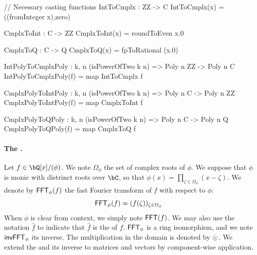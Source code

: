 \begin{code}
  // Necessary casting functions
  IntToCmplx : ZZ -> C
  IntToCmplx(x) = ((fromInteger x),zero)

  CmplxToInt : C -> ZZ
  CmplxToInt(x) = roundToEven x.0

  CmplxToQ : C -> Q
  CmplxToQ(x) = fpToRational (x.0)

  IntPolyToCmplxPoly : {k, n} (isPowerOfTwo k n) => Poly n ZZ -> Poly n C
  IntPolyToCmplxPoly(f) = map IntToCmplx f

  CmplxPolyToIntPoly : {k, n} (isPowerOfTwo k n) => Poly n C -> Poly n ZZ
  CmplxPolyToIntPoly(f) = map CmplxToInt f

  CmplxPolyToQPoly : {k, n} (isPowerOfTwo k n) => Poly n C -> Poly n Q
  CmplxPolyToQPoly(f) = map CmplxToQ f
\end{code}

 \paragraph{The \fft.} Let $f \in \bQ[x]/(\phi)$. We note $\Omega_\phi$ the set of complex roots of $\phi$. We suppose that $\phi$ is monic with distrinct roots over $\bC$, so that $\phi(x) = \prod\limits_{\zeta \in \Omega_\phi} (x - \zeta)$. We denote by $\textsf{FFT}_\phi(f)$ the fast Fourier transform of $f$ with respect to $\phi$:
 \begin{equation}
  \textsf{FFT}_\phi(f) = (f(\zeta))_{\zeta \in \Omega_\phi}
 \end{equation}
 When $\phi$ is clear from context, we simply note $\textsf{FFT}(f)$. We may also use the notation $\hat f$ to indicate that $\hat f$ is the \fft of $f$. $\textsf{FFT}_\phi$ is a ring isomorphism, and we note $\textsf{invFFT}_\phi$ its inverse. The multiplication in the \fft domain is denoted by $ \odot $. We extend the \fft and its inverse to matrices and vectors by component-wise application.


